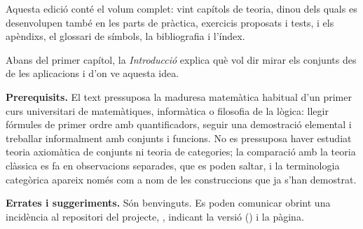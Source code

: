 Aquesta edició conté el volum complet: vint capítols de teoria, dinou
dels quals es desenvolupen també en les parts de pràctica, exercicis
proposats i tests, i els apèndixs, el glossari de símbols, la
bibliografia i l'índex.

Abans del primer capítol, la \emph{Introducció} explica què vol dir
mirar els conjunts des de les aplicacions i d'on ve aquesta idea.

\medskip
\noindent\textbf{Prerequisits.} El text pressuposa la maduresa matemàtica habitual d'un primer curs universitari de matemàtiques, informàtica o filosofia de la lògica: llegir fórmules de primer ordre amb quantificadors, seguir una demostració elemental i treballar informalment amb conjunts i funcions. No es pressuposa haver estudiat teoria axiomàtica de conjunts ni teoria de categories; la comparació amb la teoria clàssica es fa en observacions separades, que es poden saltar, i la terminologia categòrica apareix només com a nom de les construccions que ja s'han demostrat.

\medskip
\noindent\textbf{Errates i suggeriments.} Són benvinguts. Es poden comunicar obrint una incidència al repositori del projecte, \llibreerrates, indicant la versió (\llibreversio) i la pàgina.

%
